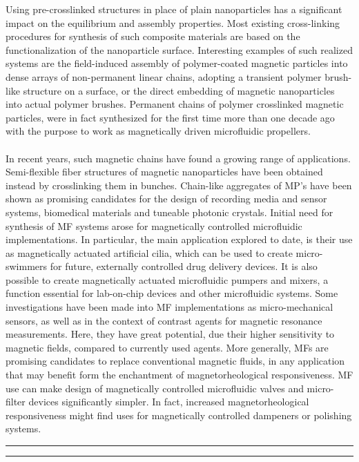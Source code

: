 \documentclass{article}
\begin{document}
Using pre-crosslinked structures in place of plain nanoparticles has a significant impact on the equilibrium and assembly properties. Most existing cross-linking procedures for synthesis of such composite materials are based on the functionalization of the nanoparticle surface. Interesting examples of such realized systems are the field-induced assembly of polymer-coated magnetic particles into dense arrays of non-permanent linear chains, adopting a transient polymer brush-like structure on a surface,\cite{Tokarev_2014} or the direct embedding of magnetic nanoparticles into actual polymer brushes.\cite{Choi_2008} Permanent chains of polymer crosslinked magnetic particles, were in fact synthesized for the first time more than one decade ago with the purpose to work as magnetically driven microfluidic propellers.\cite{Dreyfus_2005}\\\\ In recent years, such magnetic chains have found a growing range of applications.\cite{WANG_2011} Semi-flexible fiber structures of magnetic nanoparticles have been obtained instead by crosslinking them in bunches.\cite{Bharti_2015} Chain-like aggregates of MP’s have been shown as promising candidates for the design of recording media and sensor systems, biomedical materials and tuneable photonic crystals.\cite{wang2011magnetic} Initial need for synthesis of MF systems arose for magnetically controlled microfluidic implementations. In particular, the main application explored to date, is their use as magnetically actuated artificial cilia, which can be used to create micro-swimmers for future,\cite{dreyfus2005microscopic,cebers2005flexible,belovs2009erratum,javaitis2011physics} externally controlled drug delivery devices.\cite{peyer2013bio} It is also possible to create magnetically actuated microfluidic pumpers and mixers,\cite{singh2005synthesis,evans2007magnetically,babataheri2011tethered} a function essential for lab-on-chip devices and other microfluidic systems. Some investigations have been made into MF implementations as micro-mechanical sensors,\cite{goubault2003flexible} as well as in the context of contrast agents for magnetic resonance measurements. Here, they have great potential, due their higher sensitivity to magnetic fields,\cite{corr2008linear} compared to currently used agents. More generally, MFs are promising candidates to replace conventional magnetic fluids,\cite{2013,de2011magnetorheological} in any application that may benefit form the enchantment of magnetorheological responsiveness. MF use can make design of magnetically controlled microfluidic valves and micro-filter devices significantly simpler.\cite{doyle2002self} In fact, increased magnetorheological responsiveness might find uses for magnetically controlled dampeners or polishing systems.\cite{2013,de2011magnetorheological,park2010magnetorheology}
\newpage
\textcolor{NavyBlue}{\hrule height 2pt}
\vspace{1pt}
\textcolor{NavyBlue}{\hrule height 4pt}
\end{document}
